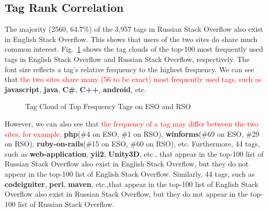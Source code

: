 \subsection{Tag Rank Correlation}

The majority (2560, 64.7\%) of the 3,957 tags in Russian Stack Overflow also exist in English Stack Overflow.
This shows that users of the two sites do share much common interest.
Fig.~\ref{fig:tagclouds} shows the tag clouds of the top-100 most frequently used tags in English Stack Overflow and Russian Stack Overflow, respectively.
The font size reflects a tag's relative frequency to the highest frequency.
We can see that \textcolor{red}{the two sites share many (56 to be exact) most frequently used tags, such as} \textbf{javascript}, \textbf{java}, \textbf{C\#}, \textbf{C++}, \textbf{android}, etc.

\begin{figure}
	\centering
	\hfill
	\caption{Tag Cloud of Top Frequency Tags on ESO and RSO}
	\label{fig:tagclouds}
\end{figure}

However, we can also see that \textcolor{red}{the frequency of a tag may differ between the two sites, for example,} \textbf{php}(\#4 on ESO, \#1 on RSO), \textbf{winforms}(\#69 on ESO, \#29 on RSO), \textbf{ruby-on-rails}(\#15 on ESO, \#60 on RSO), etc.
Furthermore, 44 tags, such as \textbf{web-application}, \textbf{yii2}, \textbf{Unity3D}, etc., that appear in the top-100 list of Russian Stack Overflow also exist in English Stack Overflow, but they do not appear in the top-100 list of English Stack Overflow.
Similarly, 44 tags, such as \textbf{codeigniter}, \textbf{perl}, \textbf{maven}, etc.,that appear in the top-100 list of English Stack Overflow also exist in Russian Stack Overflow, but they do not appear in the top-100 list of Russian Stack Overflow.

